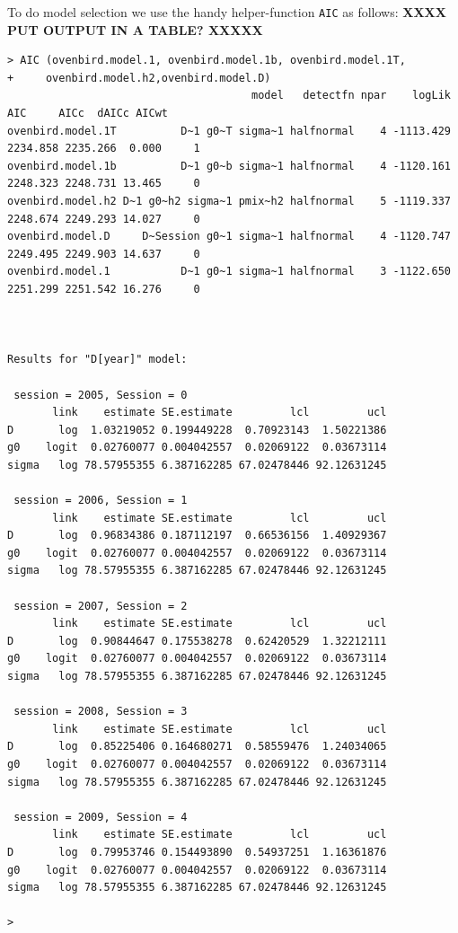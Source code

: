To do model selection  we use the handy helper-function \mbox{\tt AIC}
as follows: {\bf XXXX PUT OUTPUT IN A TABLE? XXXXX}
{\small 
\begin{verbatim}
> AIC (ovenbird.model.1, ovenbird.model.1b, ovenbird.model.1T,
+     ovenbird.model.h2,ovenbird.model.D)
                                      model   detectfn npar    logLik      AIC     AICc  dAICc AICwt
ovenbird.model.1T          D~1 g0~T sigma~1 halfnormal    4 -1113.429 2234.858 2235.266  0.000     1
ovenbird.model.1b          D~1 g0~b sigma~1 halfnormal    4 -1120.161 2248.323 2248.731 13.465     0
ovenbird.model.h2 D~1 g0~h2 sigma~1 pmix~h2 halfnormal    5 -1119.337 2248.674 2249.293 14.027     0
ovenbird.model.D     D~Session g0~1 sigma~1 halfnormal    4 -1120.747 2249.495 2249.903 14.637     0
ovenbird.model.1           D~1 g0~1 sigma~1 halfnormal    3 -1122.650 2251.299 2251.542 16.276     0



Results for "D[year]" model:

 session = 2005, Session = 0 
       link    estimate SE.estimate         lcl         ucl
D       log  1.03219052 0.199449228  0.70923143  1.50221386
g0    logit  0.02760077 0.004042557  0.02069122  0.03673114
sigma   log 78.57955355 6.387162285 67.02478446 92.12631245

 session = 2006, Session = 1 
       link    estimate SE.estimate         lcl         ucl
D       log  0.96834386 0.187112197  0.66536156  1.40929367
g0    logit  0.02760077 0.004042557  0.02069122  0.03673114
sigma   log 78.57955355 6.387162285 67.02478446 92.12631245

 session = 2007, Session = 2 
       link    estimate SE.estimate         lcl         ucl
D       log  0.90844647 0.175538278  0.62420529  1.32212111
g0    logit  0.02760077 0.004042557  0.02069122  0.03673114
sigma   log 78.57955355 6.387162285 67.02478446 92.12631245

 session = 2008, Session = 3 
       link    estimate SE.estimate         lcl         ucl
D       log  0.85225406 0.164680271  0.58559476  1.24034065
g0    logit  0.02760077 0.004042557  0.02069122  0.03673114
sigma   log 78.57955355 6.387162285 67.02478446 92.12631245

 session = 2009, Session = 4 
       link    estimate SE.estimate         lcl         ucl
D       log  0.79953746 0.154493890  0.54937251  1.16361876
g0    logit  0.02760077 0.004042557  0.02069122  0.03673114
sigma   log 78.57955355 6.387162285 67.02478446 92.12631245

> 

\end{verbatim}
}

